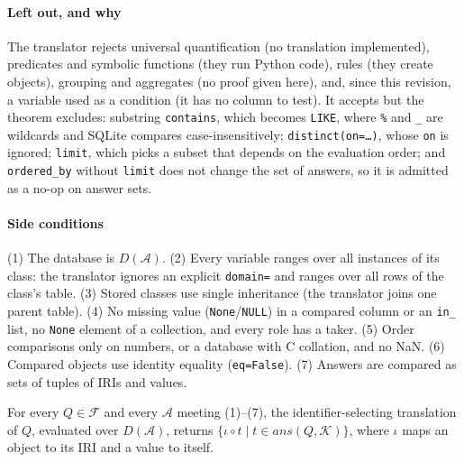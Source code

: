 \paragraph{Left out, and why} The translator rejects universal quantification (no
translation implemented), predicates and symbolic functions (they run Python code), rules (they
create objects), grouping and aggregates (no proof given here), and, since this revision, a
variable used as a condition (it has no column to test). It accepts but the theorem excludes:
substring \texttt{contains}, which becomes \texttt{LIKE}, where \texttt{\%} and \texttt{\_} are
wildcards and SQLite compares case-insensitively; \texttt{distinct(on=\dots)}, whose \texttt{on}
is ignored; \texttt{limit}, which picks a subset that depends on the evaluation order; and
\texttt{ordered\_by} without \texttt{limit} does not change the set of answers, so it is
admitted as a no-op on answer sets.

\paragraph{Side conditions} (1) The database is $D(\mathcal{A})$. (2) Every variable ranges over
all instances of its class: the translator ignores an explicit \texttt{domain=} and ranges over
all rows of the class's table. (3) Stored classes use single inheritance (the translator joins
one parent table). (4) No missing value (\texttt{None}/\texttt{NULL}) in a compared column or an
\texttt{in\_} list, no \texttt{None} element of a collection, and every role has a taker.
(5) Order comparisons only on numbers, or a database with C collation, and no NaN. (6) Compared
objects use identity equality (\texttt{eq=False}). (7) Answers are compared as sets of tuples of
IRIs and values.

\begin{theorem}
For every $Q\in\mathcal{F}$ and every $\mathcal{A}$ meeting (1)--(7), the identifier-selecting
translation of $Q$, evaluated over $D(\mathcal{A})$, returns
$\{\iota\circ t \mid t\in\mathit{ans}(Q,\mathcal{K})\}$, where $\iota$ maps an object to its IRI
and a value to itself.
\end{theorem}

